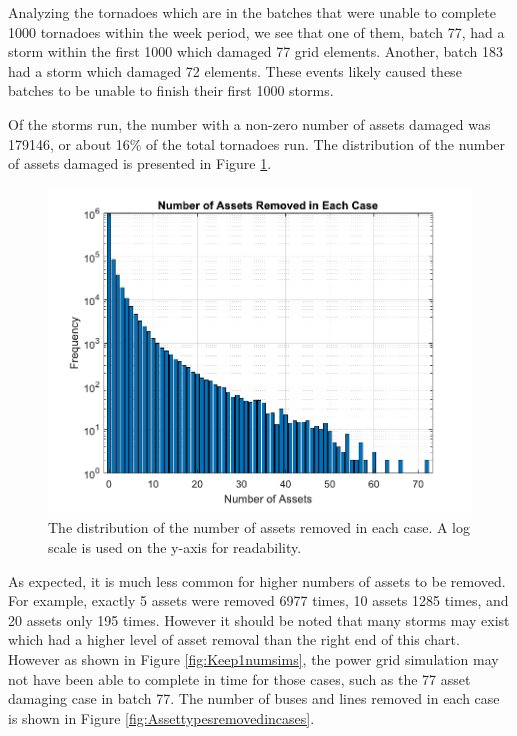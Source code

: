 \documentclass[12pt]{article}
\begin{document}
Analyzing the tornadoes which are in the batches that were unable to complete 1000 tornadoes within the week period, we see that one of them, batch 77, had a storm within the first 1000 which damaged 77 grid elements. Another, batch 183 had a storm which damaged 72 elements. These events likely caused these batches to be unable to finish their first 1000 storms. \par

Of the storms run, the number with a non-zero number of assets damaged was 179146, or about 16\% of the total tornadoes run. The distribution of the number of assets damaged is presented in Figure \ref{fig:Assetsremovedincases}. 

\begin{figure}[H]
    \centering %
    \includegraphics[scale = 0.6]{Assetsremovedincases.pdf}
    \caption[Distribution of assets removed in each case]{The distribution of the number of assets removed in each case. A log scale is used on the y-axis for readability.}
    \label{fig:Assetsremovedincases}
\end{figure}
As expected, it is much less common for higher numbers of assets to be removed. For example, exactly 5 assets were removed 6977 times, 10 assets 1285 times, and 20 assets only 195 times. However it should be noted that many storms may exist which had a higher level of asset removal than the right end of this chart. However as shown in Figure \ref{fig:Keep1numsims}, the power grid simulation may not have been able to complete in time for those cases, such as the 77 asset damaging case in batch 77. The number of buses and lines removed in each case is shown in Figure \ref{fig:Assettypesremovedincases}.
\end{document}
